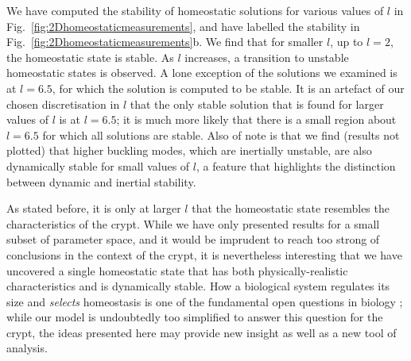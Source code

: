 We have computed the stability of homeostatic solutions for various values of $l$ in Fig.\ \ref{fig:2Dhomeostaticmeasurements}, and have labelled the stability in Fig.\ \ref{fig:2Dhomeostaticmeasurements}b. We find that for smaller $l$, up to $l = 2$, the homeostatic state is stable. As $l$ increases, a transition to unstable homeostatic states is observed. A lone exception of the solutions we examined is at $l = 6.5$, for which the solution is computed to be stable. It is an artefact of our chosen discretisation in $l$ that the only stable solution that is found for larger values of $l$ is at $l = 6.5$; it is much more likely that there is a small region about $l = 6.5$ for which all solutions are stable. Also of note is that we find (results not plotted) that higher buckling modes, which are inertially unstable, are also dynamically stable for small values of $l$, a feature that highlights the distinction between dynamic and inertial stability. 

As stated before, it is only at larger $l$ that the homeostatic state resembles the characteristics of the crypt. While we have only presented results for a small subset of parameter space, and it would be imprudent to reach too strong of conclusions in the context of the crypt, it is nevertheless interesting that we have uncovered a single homeostatic state that has both physically-realistic characteristics and is dynamically stable. How a biological system regulates its size and {\it selects} homeostasis is one of the fundamental open questions in biology \cite{Goriely:2016tc}; while our model is undoubtedly too simplified to answer this question for the crypt, the ideas presented here may provide new insight as well as a new tool of analysis.

